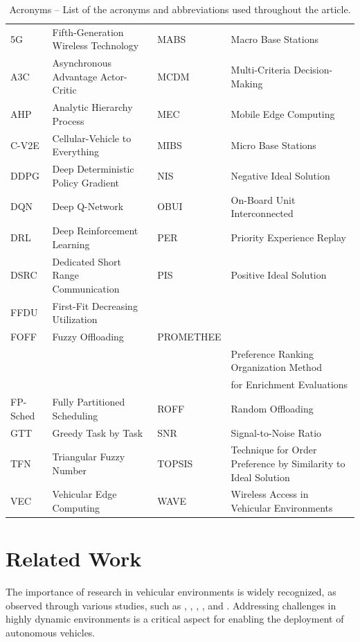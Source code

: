 \documentclass[iicol]{sn-jnl}
\begin{document}
\begin{table}[h!]
    \scriptsize
    \centering
    \caption{Acronyms – List of the acronyms and abbreviations used throughout the article.}
    {\setlength{\tabcolsep}{2pt} %
    \renewcommand{\arraystretch}{1.2}    
    \begin{tabularx}{\textwidth}{p{}@{\hskip 2pt}>{\raggedright\arraybackslash}p{} p{}@{\hskip 2pt}>{\raggedright\arraybackslash}p{}}
    \toprule    
    5G & Fifth-Generation Wireless Technology & MABS & Macro Base Stations\\      
    A3C & Asynchronous Advantage Actor-Critic & MCDM & Multi-Criteria Decision-Making\\
    AHP & Analytic Hierarchy Process & MEC & Mobile Edge Computing\\
    C-V2E & Cellular-Vehicle to Everything & MIBS & Micro Base Stations\\
    DDPG & Deep Deterministic Policy Gradient & NIS & Negative Ideal Solution\\
    DQN & Deep Q-Network & OBUI & On-Board Unit Interconnected\\
    DRL & Deep Reinforcement Learning & PER & Priority Experience Replay\\
    DSRC & Dedicated Short Range Communication & PIS & Positive Ideal Solution\\
    FFDU & First-Fit Decreasing Utilization & \\
    FOFF & Fuzzy Offloading & PROMETHEE & \\
    && & Preference Ranking Organization Method\\
    && & for Enrichment Evaluations\\
    FP-Sched & Fully Partitioned Scheduling & ROFF & Random Offloading\\
    GTT & Greedy Task by Task & SNR & Signal-to-Noise Ratio\\
    TFN & Triangular Fuzzy Number & TOPSIS & Technique for Order Preference by Similarity to Ideal Solution\\
    VEC & Vehicular Edge Computing & WAVE & Wireless Access in Vehicular Environments \\
    \bottomrule
    \end{tabularx}
    }
    \label{tab:acronyms}
\end{table}


\section{Related Work}\label{sec_related_work}
The importance of research in vehicular environments is widely recognized, as observed through various studies, such as \cite{bi2023back}, \cite{zhang2022vehicular}, \cite{guo2024deep}, \cite{mirza2023drl}, and \cite{alam2024energy}. Addressing challenges in highly dynamic environments is a critical aspect for enabling the deployment of autonomous vehicles.
\end{document}
